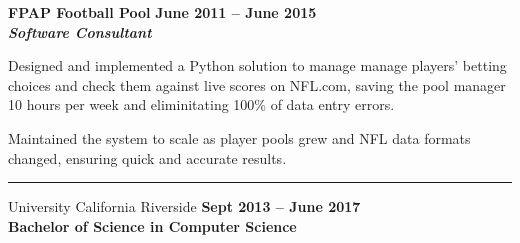 \documentclass[10pt]{article}
\newcommand{\thing}[1][]{\item #1}
\newcommand{\sectionheader}[1]{
    \vspace{3pt}
    \StrSplit{#1}{3}{\firstpart}{\lastpart} %

    \makebox[0pt][l]{\textbf{\LARGE\firstpart\lastpart}}%
    \rule[-1ex]{\columnwidth}{.1pt}

}
\newcommand{\dates}[2]{
    \textbf{#1 -- #2}
}
\newcommand{\+}{\raisebox{0.2ex}{+}} %
\newcommand{\gt}{\raisebox{0.1ex}{\textgreater}} %
\begin{document}
    \textbf{\large FPAP Football Pool} \hfill \dates{June 2011}{June 2015}\\
    \textit{\textbf{Software Consultant}}
    \begin{things}
        \thing Designed and implemented a Python solution to manage
                manage players' betting choices and check them against
                live scores on NFL.com, saving the pool manager
                \gt10 hours per week and eliminitating 100\% of data entry errors.
        \thing Maintained the system to scale as player pools grew and
                NFL data formats changed, ensuring quick and accurate results.
    \end{things}
    
    \sectionheader{Education}
    University California Riverside \hfill \dates{Sept 2013}{June 2017}\\
    \textbf{Bachelor of Science in Computer Science}


\end{document}
